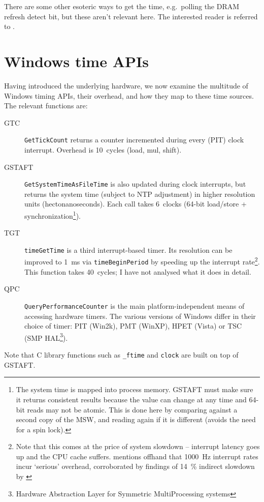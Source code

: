 \documentclass[a4paper,12pt,pdftex]{article}
\newcommand{\id}[1]{\texttt{#1}}
\begin{document}
There are some other esoteric ways to get the time, e.g.\ polling the DRAM refresh detect bit, but these aren't relevant here.
The interested reader is referred to \citep{HeidenstromTiming}.


\section{Windows time APIs}
\label{sec:windowsApis}

Having introduced the underlying hardware, we now examine the multitude of Windows timing APIs, their overhead, and how they map to these time sources.  The relevant functions are:
\begin{description}
	\item[GTC] \id{GetTickCount} returns a counter incremented during every (PIT) clock interrupt. Overhead is 10~cycles (load, mul, shift).
	\item[GSTAFT] \id{GetSystemTimeAsFileTime} is also updated during clock interrupts, but returns the system time (subject to NTP adjustment) in higher resolution units (hectonanoseconds). Each call takes 6~clocks (64-bit load/store + synchronization\footnote{The system time is mapped into process memory. GSTAFT must make sure it returns consistent results because the value can change at any time and 64-bit reads may not be atomic. This is done here by comparing against a second copy of the MSW, and reading again if it is different (avoids the need for a spin lock).}).
	\item[TGT] \id{timeGetTime} is a third interrupt-based timer. Its resolution can be improved to 1~ms via \id{timeBeginPeriod} by speeding up the interrupt rate\footnote{Note that this comes at the price of system slowdown -- interrupt latency goes up and the CPU cache suffers. \citep{mm-timer} mentions offhand that 1000~Hz interrupt rates incur `serious' overhead, corroborated by findings of 14~\% indirect slowdown by \citet{failurePeriodicTimers}}. This function takes 40~cycles; I have not analysed what it does in detail.
\pagebreak
	\item[QPC] \id{QueryPerformanceCounter} is the main platform-independent means of accessing hardware timers. The various versions of Windows differ in their choice of timer: PIT (Win2k), PMT (WinXP), HPET (Vista) or TSC (SMP HAL\footnote{Hardware Abstraction Layer for Symmetric MultiProcessing systems}).
\end{description}

Note that C library functions such as \id{\_ftime} and \id{clock} are built on top of GSTAFT.
\end{document}
